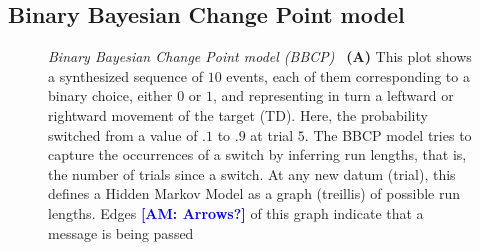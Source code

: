 \documentclass[12pt,english]{article}%
\newcommand{\seeFig}[1]{Figure~\ref{fig:#1}}
\newcommand{\AM}[1]{\textbf{\textcolor{blue}{[AM: #1]}}}
\begin{document}
\subsection{Binary Bayesian Change Point model}
\begin{figure}%
\caption{\emph{Binary Bayesian Change Point model (BBCP)}
~\textbf{(A)} This plot shows a synthesized sequence of $10$ events,
each of them corresponding to a binary choice, either $0$ or $1$,
and representing in turn a leftward or rightward movement of the target (TD).
Here, the probability switched from a value of $.1$ to $.9$ at trial $5$.
The BBCP model tries to capture the occurrences of a switch by inferring run lengths,
that is, the number of trials since a switch.
At any new datum (trial), this defines a Hidden Markov Model
as a graph (treillis) of possible run lengths.
Edges \AM{Arrows?} of this graph indicate that a message is being passed
}
\end{figure}
\end{document}
